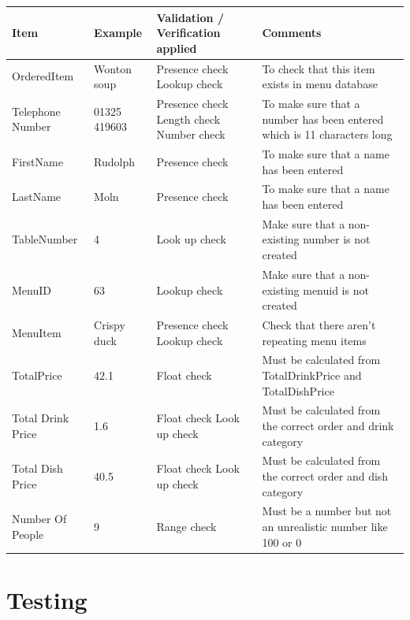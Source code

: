 \begin{center}
    \begin{tabular}{|p{2cm}|p{4cm}|p{2cm}|p{4cm}|}
        \hline
        \textbf{Item} & \textbf{Example} & \textbf{Validation / Verification applied} & \textbf{Comments}\\ \hline
      OrderedItem & Wonton soup &  Presence check Lookup check & To check that this item exists in menu database \\ \hline
	Telephone Number & 01325 419603 &Presence check Length check Number check & To make sure that a number has been entered which is 11 characters long \\ \hline
	FirstName & Rudolph & Presence check & To make sure that a name has been entered \\ \hline
	LastName & Moln & Presence check & To make sure that a name has been entered \\ \hline
	TableNumber & 4 &Look up check & Make sure that a non-existing number is not created \\ \hline
	MenuID & 63 & Lookup check & Make sure that a non-existing menuid is not created \\ \hline
	MenuItem & Crispy duck & Presence check Lookup check & Check that there aren't repeating menu items \\ \hline
	TotalPrice & 42.1 & Float check & Must be calculated from TotalDrinkPrice and TotalDishPrice \\ \hline
	Total Drink Price & 1.6 & Float check  Look up check& Must be calculated from the correct order and drink category \\ \hline
	Total Dish Price & 40.5 & Float check Look up check & Must be calculated from the correct order and dish category \\ \hline
	Number Of People & 9 & Range check & Must be a number but not an unrealistic number like 100 or 0 \\ \hline
	
    \end{tabular}
\end{center}

\section{Testing}

